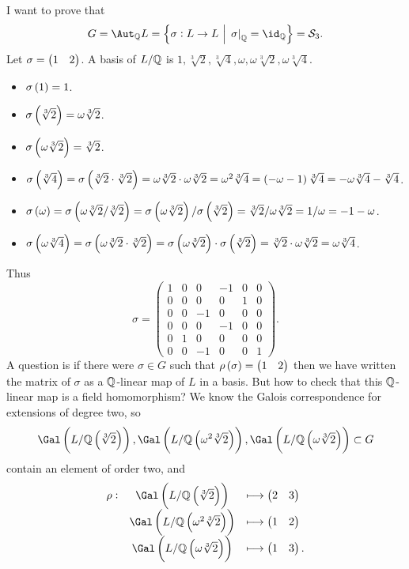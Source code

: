 I want to prove that
$$ G = \Aut_\QQ L = \cbr{\sigma : L \to L \st \eval{\sigma}_\QQ = \id_\QQ} = \SSS_3. $$
Let $ \sigma = \begin{pmatrix} 1 & 2 \end{pmatrix} $. A basis of $ L / \mathbb{Q} $ is $ 1, \sqrt[3]{2}, \sqrt[3]{4}, \omega, \omega\sqrt[3]{2}, \omega\sqrt[3]{4} $.
\begin{itemize}
\item $ \sigma\br{1} = 1 $.
\item $ \sigma\br{\sqrt[3]{2}} = \omega\sqrt[3]{2} $.
\item $ \sigma\br{\omega\sqrt[3]{2}} = \sqrt[3]{2} $.
\item $ \sigma\br{\sqrt[3]{4}} = \sigma\br{\sqrt[3]{2} \cdot \sqrt[3]{2}} = \omega\sqrt[3]{2} \cdot \omega\sqrt[3]{2} = \omega^2\sqrt[3]{4} = \br{-\omega - 1}\sqrt[3]{4} = -\omega\sqrt[3]{4} - \sqrt[3]{4} $.
\item $ \sigma\br{\omega} = \sigma\br{\omega\sqrt[3]{2} / \sqrt[3]{2}} = \sigma\br{\omega\sqrt[3]{2}} / \sigma\br{\sqrt[3]{2}} = \sqrt[3]{2} / \omega\sqrt[3]{2} = 1 / \omega = -1 - \omega $.
\item $ \sigma\br{\omega\sqrt[3]{4}} = \sigma\br{\omega\sqrt[3]{2} \cdot \sqrt[3]{2}} = \sigma\br{\omega\sqrt[3]{2}} \cdot \sigma\br{\sqrt[3]{2}} = \sqrt[3]{2} \cdot \omega\sqrt[3]{2} = \omega\sqrt[3]{4} $.
\end{itemize}
Thus
$$ \sigma =
\begin{pmatrix}
1 & 0 & 0 & -1 & 0 & 0 \\
0 & 0 & 0 & 0 & 1 & 0 \\
0 & 0 & -1 & 0 & 0 & 0 \\
0 & 0 & 0 & -1 & 0 & 0 \\
0 & 1 & 0 & 0 & 0 & 0 \\
0 & 0 & -1 & 0 & 0 & 1
\end{pmatrix}.
$$
A question is if there were $ \sigma \in G $ such that $ \rho\br{\sigma} = \onebytwo{1}{2} $ then we have written the matrix of $ \sigma $ as a $ \mathbb{Q} $-linear map of $ L $ in a basis. But how to check that this $ \mathbb{Q} $-linear map is a field homomorphism? We know the Galois correspondence for extensions of degree two, so
$$ \Gal\br{L / \QQ\br{\sqrt[3]{2}}}, \Gal\br{L / \QQ\br{\omega^2\sqrt[3]{2}}}, \Gal\br{L / \QQ\br{\omega\sqrt[3]{2}}} \subset G $$
contain an element of order two, and
$$
\begin{array}{rcl}
\rho : & \Gal\br{L / \QQ\br{\sqrt[3]{2}}} & \longmapsto \onebytwo{2}{3} \\
& \Gal\br{L / \QQ\br{\omega^2\sqrt[3]{2}}} & \longmapsto \onebytwo{1}{2} \\
& \Gal\br{L / \QQ\br{\omega\sqrt[3]{2}}} & \longmapsto \onebytwo{1}{3}.
\end{array}
$$
